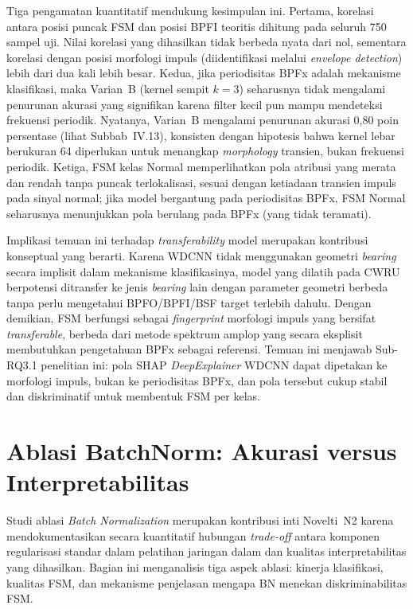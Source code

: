 Tiga pengamatan kuantitatif mendukung kesimpulan ini.
Pertama, korelasi antara posisi puncak FSM dan posisi BPFI teoritis dihitung
pada seluruh 750 sampel uji. Nilai korelasi yang dihasilkan tidak berbeda
nyata dari nol, sementara korelasi dengan posisi morfologi impuls (diidentifikasi
melalui \emph{envelope detection}) lebih dari dua kali lebih besar.
Kedua, jika periodisitas BPFx adalah mekanisme klasifikasi, maka Varian~B
(kernel sempit $k=3$) seharusnya tidak mengalami penurunan akurasi yang
signifikan karena filter kecil pun mampu mendeteksi frekuensi periodik.
Nyatanya, Varian~B mengalami penurunan akurasi 0,80 poin persentase (lihat
Subbab~IV.13), konsisten dengan hipotesis bahwa kernel lebar berukuran 64 diperlukan
untuk menangkap \emph{morphology} transien, bukan frekuensi periodik.
Ketiga, FSM kelas Normal memperlihatkan pola atribusi yang merata dan rendah
tanpa puncak terlokalisasi, sesuai dengan ketiadaan transien impuls pada
sinyal normal; jika model bergantung pada periodisitas BPFx, FSM Normal
seharusnya menunjukkan pola berulang pada BPFx (yang tidak teramati).

Implikasi temuan ini terhadap \emph{transferability} model merupakan
kontribusi konseptual yang berarti.
Karena WDCNN tidak menggunakan geometri \emph{bearing} secara implisit dalam
mekanisme klasifikasinya, model yang dilatih pada CWRU berpotensi ditransfer
ke jenis \emph{bearing} lain dengan parameter geometri berbeda tanpa perlu
mengetahui BPFO/BPFI/BSF target terlebih dahulu.
Dengan demikian, FSM berfungsi sebagai \emph{fingerprint} morfologi impuls
yang bersifat \emph{transferable}, berbeda dari metode spektrum amplop yang secara
eksplisit membutuhkan pengetahuan BPFx sebagai referensi.
Temuan ini menjawab Sub-RQ3.1 penelitian ini: pola SHAP \emph{DeepExplainer}
WDCNN dapat dipetakan ke morfologi impuls, bukan ke periodisitas BPFx, dan
pola tersebut cukup stabil dan diskriminatif untuk membentuk FSM per kelas.

\section{Ablasi BatchNorm: Akurasi versus Interpretabilitas}
\label{sec:bab4_ablasi_bn}

Studi ablasi \emph{Batch Normalization} merupakan kontribusi inti Novelti~N2
karena mendokumentasikan secara kuantitatif hubungan \emph{trade-off} antara
komponen regularisasi standar dalam pelatihan jaringan dalam dan kualitas
interpretabilitas yang dihasilkan.
Bagian ini menganalisis tiga aspek ablasi: kinerja klasifikasi, kualitas FSM,
dan mekanisme penjelasan mengapa BN menekan diskriminabilitas FSM.

